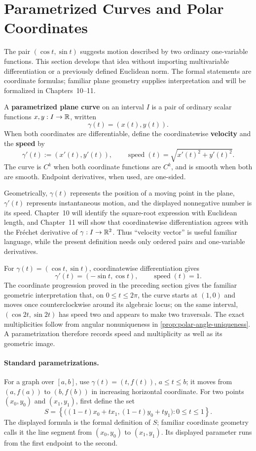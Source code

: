 \section{Parametrized Curves and Polar Coordinates}
\label{sec:elementary-curves-polar}
The pair $(\cos t,\sin t)$ suggests motion described by two ordinary
one-variable functions. This section develops that idea without importing
multivariable differentiation or a previously defined Euclidean norm. The
formal statements are coordinate formulas; familiar plane geometry supplies
interpretation and will be formalized in Chapters~10--11.
\begin{definition}
\label{def:elementary-plane-curve}
A \textbf{parametrized plane curve} on an interval $I$ is a pair of ordinary
scalar functions $x,y:I\to\mathbb{R}$, written
\[
\gamma(t)=(x(t),y(t)).
\]
When both coordinates are differentiable, define the coordinatewise
\textbf{velocity} and the \textbf{speed} by
\[
\gamma'(t):=(x'(t),y'(t)),\qquad
\operatorname{speed}(t)=\sqrt{x'(t)^2+y'(t)^2}.
\]
The curve is $C^k$ when both coordinate functions are $C^k$, and is smooth
when both are smooth. Endpoint derivatives, when used, are one-sided.
\end{definition}

Geometrically, $\gamma(t)$ represents the position of a moving point in the
plane, $\gamma'(t)$ represents instantaneous motion, and the displayed
nonnegative number is its speed. Chapter~10 will identify the square-root
expression with Euclidean length, and Chapter~11 will show that coordinatewise
differentiation agrees with the Fr\'echet derivative of
$\gamma:I\to\mathbb{R}^2$. Thus ``velocity vector'' is useful familiar language,
while the present definition needs only ordered pairs and one-variable
derivatives.

For $\gamma(t)=(\cos t,\sin t)$, coordinatewise differentiation gives
\[
\gamma'(t)=(-\sin t,\cos t),
\qquad
\operatorname{speed}(t)=1.
\]
The coordinate progression proved in the preceding section gives the
familiar geometric interpretation that, on $0\leq t\leq2\pi$, the curve
starts at $(1,0)$ and moves once counterclockwise around its algebraic locus;
on the same interval, $(\cos2t,\sin2t)$ has speed two and appears to make two
traversals. The exact multiplicities follow from angular nonuniqueness in
\cref{prop:polar-angle-uniqueness}. A parametrization therefore records speed
and multiplicity as well as its geometric image.

\paragraph{Standard parametrizations.}
For a graph over $[a,b]$, use $\gamma(t)=(t,f(t))$, $a\leq t\leq b$;
it moves from $(a,f(a))$ to $(b,f(b))$ in increasing horizontal coordinate.
For two points $(x_0,y_0)$ and $(x_1,y_1)$, first define the set
\[
S=\left\{
\bigl((1-t)x_0+tx_1,(1-t)y_0+ty_1\bigr):0\leq t\leq1
\right\}.
\]
The displayed formula is the formal definition of $S$; familiar coordinate
geometry calls it the line segment from $(x_0,y_0)$ to $(x_1,y_1)$.
Its displayed parameter runs from the first endpoint to the second.

